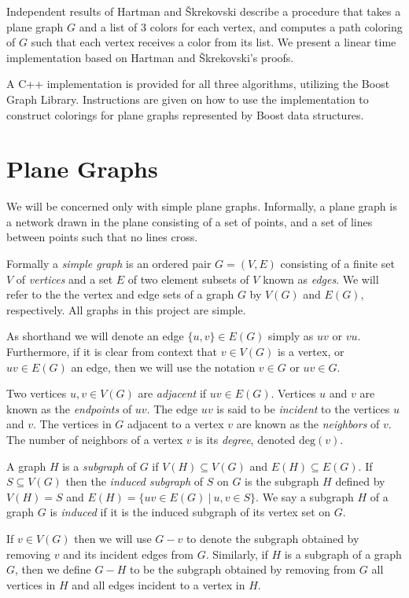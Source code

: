 \documentclass[letterpaper, 12pt]{article}
\theoremstyle{thm}
\begin{document}
Independent results of Hartman and \v{S}krekovski describe a procedure that takes
a plane graph $G$ and a list of $3$ colors for each vertex, and
computes a path coloring of $G$ such that each vertex receives a color from its
list. We present a linear time implementation based on Hartman and \v{S}krekovski's
proofs.

A C++ implementation is provided for all three algorithms, utilizing the Boost
Graph Library. Instructions are given on how to use the implementation
to construct colorings for plane graphs represented by Boost data
structures.

\pagebreak

\section{Plane Graphs}

We will be concerned only with simple plane graphs. Informally, a plane graph
is a network drawn in the plane consisting of a set of points, and a set of
lines between points such that no lines cross.

Formally a \textit{simple graph} is an ordered pair $G=(V,E)$ consisting of a finite set
$V$ of \textit{vertices} and a set $E$ of two element subsets of $V$ known as
\textit{edges}. We will refer to the the vertex and edge sets of a graph $G$ by
$V(G)$ and $E(G)$, respectively. All graphs in this project are simple.

As shorthand we will denote an edge $\{u,v\}\in E(G)$ simply as $uv$ or $vu$.
Furthermore, if it is clear from context that $v\in V(G)$ is a vertex, or $uv\in
E(G)$ an edge, then we will use the notation $v\in G$ or $uv\in G$.

Two vertices $u,v\in V(G)$ are \textit{adjacent} if $uv\in E(G)$. Vertices $u$
and $v$ are known as the \textit{endpoints} of $uv$. The edge $uv$ is said to be
\textit{incident} to the vertices $u$ and $v$. The vertices in $G$ adjacent to a
vertex $v$ are known as the \textit{neighbors} of $v$. The number of neighbors
of a vertex $v$ is its \textit{degree}, denoted $\text{deg}(v)$.

A graph $H$ is a \textit{subgraph} of $G$ if $V(H)\subseteq V(G)$ and
$E(H)\subseteq E(G)$. If $S\subseteq V(G)$ then the \textit{induced subgraph} of
$S$ on $G$ is the subgraph $H$ defined by $V(H)=S$ and
$E(H)=\{uv\in E(G) \ | \ u,v\in S\}$. We say a subgraph $H$ of a graph $G$ is
\textit{induced} if it is the induced subgraph of its vertex set on $G$.

If $v\in V(G)$ then we will use $G-v$ to denote the subgraph obtained by removing $v$
and its incident edges from $G$. Similarly, if $H$ is a subgraph of a graph $G$,
then we define $G-H$ to be the subgraph obtained by removing from $G$ all vertices in
$H$ and all edges incident to a vertex in $H$.
\end{document}
